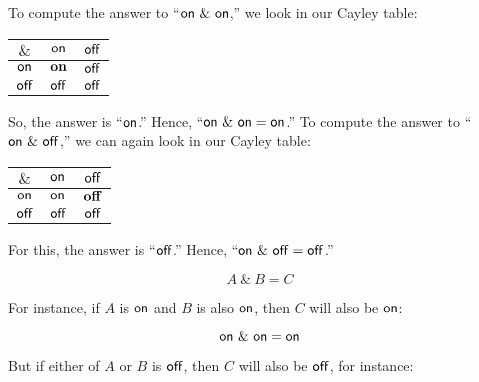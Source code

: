 \documentclass[../../../main.tex]{subfiles}
\begin{document}
\begin{aside}
  \begin{remark}
    To compute the answer to ``$\mathsf{on}~\&~\mathsf{on}$,'' we look in our Cayley table:
  
    \begin{center}
      \begin{tabular}{| c || c | c |}
        \hline
        $\&$      & \cellcolor{grey3} $\mathsf{on}$  & $\mathsf{off}$ \\ \hline \hline
        \cellcolor{grey3} $\mathsf{on}$  & \cellcolor{grey3} $\mathsf{\mathbf{on}}$  & $\mathsf{off}$ \\ \hline
        $\mathsf{off}$ & $\mathsf{off}$ & $\mathsf{off}$ \\ \hline
      \end{tabular}
    \end{center}
    
    So, the answer is ``$\mathsf{on}$.'' Hence, ``$\mathsf{on}~\&~\mathsf{on} = \mathsf{on}$.'' To compute the answer to ``$\mathsf{on}~\&~\mathsf{off}$,'' we can again look in our Cayley table:
    
    \begin{center}
      \begin{tabular}{| c || c | c |}
        \hline
        $\&$      & $\mathsf{on}$  & \cellcolor{grey3} $\mathsf{off}$ \\ \hline \hline
        \cellcolor{grey3} $\mathsf{on}$  & \cellcolor{grey3} $\mathsf{on}$  & \cellcolor{grey3} $\mathsf{\mathbf{off}}$ \\ \hline
        $\mathsf{off}$ & $\mathsf{off}$ & $\mathsf{off}$ \\ \hline
      \end{tabular}
    \end{center}
    
    For this, the answer is ``$\mathsf{off}$.'' Hence, ``$\mathsf{on}~\&~\mathsf{off} = \mathsf{off}$.''
  \end{remark}
\end{aside}

\begin{equation*}
  A~\&~B = C
\end{equation*}

For instance, if $A$ is $\mathsf{on}$ and $B$ is also $\mathsf{on}$, then $C$ will also be $\mathsf{on}$: 

\begin{equation*}
  \mathsf{on}~\&~\mathsf{on} = \mathsf{on}
\end{equation*}

But if either of $A$ or $B$ is $\mathsf{off}$, then $C$ will also be $\mathsf{off}$, for instance:
\end{document}
